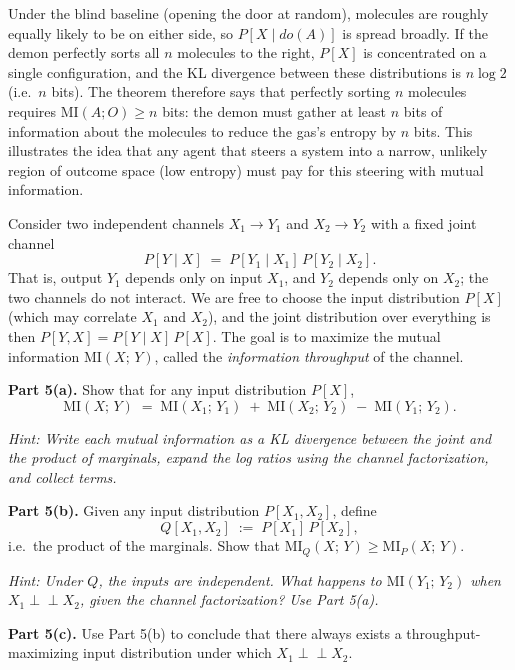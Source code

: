 \documentclass[11pt]{article}
\begin{document}
\begin{exercise}
\medskip
\noindent
Under the blind baseline (opening the door at random), molecules are roughly equally
likely to be on either side, so $P[X \mid do(A)]$ is spread broadly. If the demon
perfectly sorts all $n$ molecules to the right, $P[X]$ is concentrated on a single
configuration, and the KL divergence between these distributions is $n \log 2$ (i.e.\
$n$ bits). The theorem therefore says that perfectly sorting $n$ molecules requires
$\mathrm{MI}(A; O) \geq n$ bits: the demon must gather at least $n$ bits of
information about the molecules to reduce the gas's entropy by $n$ bits.
This illustrates the idea that any agent that steers a system into a narrow, unlikely region of outcome space (low entropy) must pay for this steering with mutual information. 
\end{exercise}


\begin{exercise}
\label{ex:channel-additivity}
\noindent
Consider two independent channels $X_1 \to Y_1$ and $X_2 \to Y_2$ with a fixed
joint channel
\[
  P[Y \mid X] \;=\; P[Y_1 \mid X_1]\, P[Y_2 \mid X_2].
\]
That is, output $Y_1$ depends only on input $X_1$, and $Y_2$ depends only on $X_2$;
the two channels do not interact. We are free to choose the input distribution $P[X]$
(which may correlate $X_1$ and $X_2$), and the joint distribution over everything is
then $P[Y, X] = P[Y \mid X]\, P[X]$. The goal is to maximize the mutual information
$\mathrm{MI}(X;\, Y)$, called the \emph{information throughput} of the channel.

\medskip
\noindent
\textbf{Part 5(a).} Show that for any input distribution $P[X]$,
\[
  \mathrm{MI}(X;\, Y) \;=\;
  \mathrm{MI}(X_1;\, Y_1) \;+\; \mathrm{MI}(X_2;\, Y_2) \;-\;
  \mathrm{MI}(Y_1;\, Y_2).
\]

\medskip
\noindent
\emph{Hint: Write each mutual information as a KL divergence between the joint and
the product of marginals, expand the log ratios using the channel factorization, and
collect terms.}

\medskip
\noindent
\textbf{Part 5(b).} Given any input distribution $P[X_1, X_2]$, define
\[
  Q[X_1, X_2] \;:=\; P[X_1]\, P[X_2],
\]
i.e.\ the product of the marginals. Show that
$\mathrm{MI}_Q(X;\, Y) \geq \mathrm{MI}_P(X;\, Y)$.

\medskip
\noindent
\emph{Hint: Under $Q$, the inputs are independent. What happens to
$\mathrm{MI}(Y_1;\, Y_2)$ when $X_1 \perp\!\!\!\perp X_2$, given the channel
factorization? Use Part 5(a).}

\medskip
\noindent
\textbf{Part 5(c).} Use Part 5(b) to conclude that there always exists a
throughput-maximizing input distribution under which $X_1 \perp\!\!\!\perp X_2$.


\end{exercise}
\end{document}
